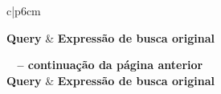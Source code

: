 \begin{center}
\begin{longtable}{c|p{6cm}}
\caption[Expressões de busca originais da coleção pública]{Expressões de busca originais da coleção pública}
\label{tabQueriesOriginais}

\hline \textbf{Query} & \centering \textbf{Expressão de busca original} \\ \hline 
\endfirsthead

%
{{\bfseries \tablename\ \thetable{} -- continuação da página anterior}} \\
\hline \textbf{Query} &  \centering \textbf{Expressão de busca original} \\ \hline 
\endhead

\hline {} \\ \hline
\endfoot

\endlastfoot





\end{longtable}
\end{center}
